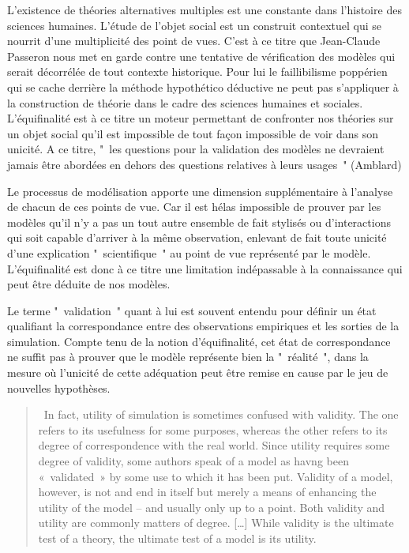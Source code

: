 L’existence de théories alternatives multiples est une constante dans l’histoire des sciences humaines. L'étude de l'objet social est un construit contextuel qui se nourrit d'une multiplicité des point de vues. C'est à ce titre que Jean-Claude Passeron \autocite{Passeron2006} nous met en garde contre une tentative de vérification des modèles qui serait décorrélée de tout contexte historique. Pour lui le faillibilisme poppérien qui se cache derrière la méthode hypothético déductive ne peut pas s'appliquer à la construction de théorie dans le cadre des sciences humaines et sociales. L'équifinalité est à ce titre un moteur permettant de confronter nos théories sur un objet social  qu'il est impossible de tout façon impossible de voir dans son unicité. A ce titre, " les questions pour  la validation des modèles ne devraient jamais être abordées en dehors des questions relatives à leurs usages " (Amblard)

Le processus de modélisation apporte une dimension supplémentaire à l'analyse de chacun de ces points de vue. Car  il est hélas  impossible de prouver par les modèles qu'il n'y a pas un tout autre ensemble de fait stylisés ou d'interactions qui soit capable d'arriver à la même observation, enlevant de fait toute unicité d’une explication " scientifique " au point de vue représenté par le modèle. L'équifinalité est donc à ce titre une limitation indépassable à la connaissance qui peut être déduite de nos modèles.

Le terme " validation " quant à lui est souvent entendu pour définir un état qualifiant la correspondance entre des observations empiriques et les sorties de la simulation. Compte tenu de la notion d'équifinalité, cet état de correspondance ne suffit pas à prouver que le modèle représente bien la " réalité ", dans la mesure où l’unicité de  cette adéquation peut être remise en cause par le jeu de nouvelles hypothèses.

\begin{quotation} In fact, utility of simulation is sometimes confused with validity. The one refers to its usefulness for some purposes, whereas the other refers to its degree of correspondence with the real world. Since utility requires some degree of validity, some authors speak of a model as havng been « validated » by some use to which it has been put. Validity of a model, however, is not and end in itself but merely a means of enhancing the utility of the model – and usually only up to a point. Both validity and utility are commonly matters of degree. […] While validity is the ultimate test of a theory, the ultimate test of a model is its utility.  \\ \end{quotation}

